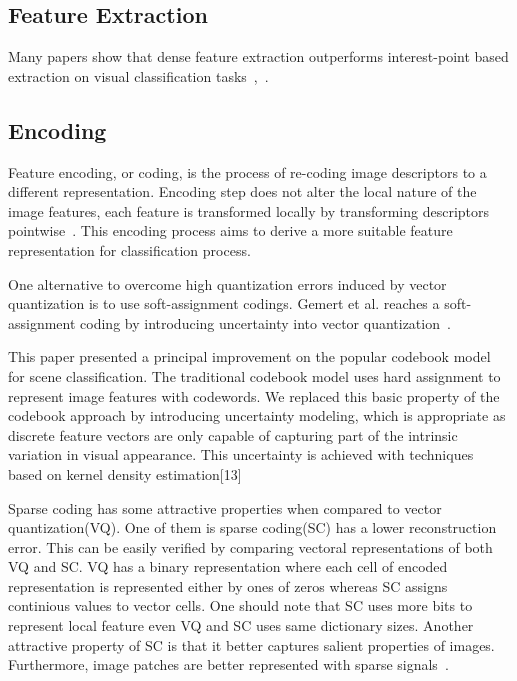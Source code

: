 \documentclass[conference]{IEEEtran}
\begin{document}
\subsection{Feature Extraction}

Many papers show that dense feature extraction outperforms interest-point based extraction on visual classification tasks~\cite{6248076},~\cite{1541309}.

\subsection{Encoding}

Feature encoding, or coding, is the process of re-coding image descriptors to a different representation. Encoding step does not alter the local nature of the image features, each feature is transformed locally by transforming descriptors pointwise~\cite{5539963}. This encoding process aims to derive a more suitable feature representation for classification process.

One alternative to overcome high quantization errors induced by vector quantization is to use soft-assignment codings. Gemert et al. reaches a soft-assignment coding by introducing uncertainty into vector quantization~\cite{5128909}.

This paper presented a principal improvement on the popular codebook model for scene classification. The traditional codebook model uses hard assignment to represent image features with codewords. We replaced this basic property of the codebook approach by introducing uncertainty modeling, which is appropriate as discrete feature vectors are only capable of capturing part of the intrinsic variation in visual appearance. This uncertainty is achieved with techniques based on kernel density estimation[13]

Sparse coding has some attractive properties when compared to vector quantization(VQ). One of them is sparse coding(SC) has a lower reconstruction error. This can be easily verified by comparing vectoral representations of both VQ and SC. VQ has a binary representation where each cell of encoded representation is represented either by ones of zeros whereas SC assigns continious values to vector cells. One should note that SC uses more bits to represent local feature even VQ and SC uses same dictionary sizes. Another attractive property of SC is that it better captures salient properties of images. Furthermore, image patches are better represented with sparse signals~\cite{5539963}.
\end{document}
